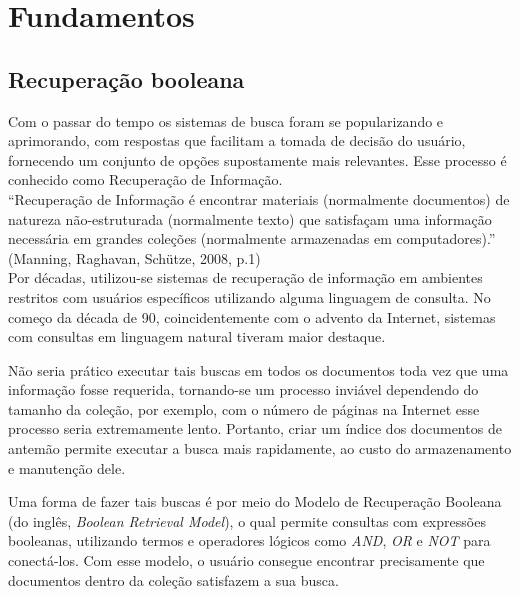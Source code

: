 \chapter{Fundamentos}
\label{cap:fundamentos}


\section{Recuperação booleana}
\label{sec:recuperacao_booleana}

Com o passar do tempo os sistemas de busca foram se popularizando e aprimorando, com respostas que facilitam a tomada de decisão do usuário, fornecendo um conjunto de opções supostamente mais relevantes. Esse processo é conhecido como Recuperação de Informação. \\

``Recuperação de Informação é encontrar materiais (normalmente documentos) de natureza não-estruturada (normalmente texto) que satisfaçam uma informação necessária em grandes coleções (normalmente armazenadas em computadores).'' (Manning, Raghavan, Schütze, 2008, p.1) \\

Por décadas, utilizou-se sistemas de recuperação de informação em ambientes restritos com usuários específicos utilizando alguma linguagem de consulta. No começo da década de 90, coincidentemente com o advento da Internet, sistemas com consultas em linguagem natural tiveram maior destaque.

Não seria prático executar tais buscas em todos os documentos toda vez que uma informação fosse requerida, tornando-se um processo inviável dependendo do tamanho da coleção, por exemplo, com o número de páginas na Internet esse processo seria extremamente lento. Portanto, criar um índice dos documentos de antemão permite executar a busca mais rapidamente, ao custo do armazenamento e manutenção dele.

Uma forma de fazer tais buscas é por meio do Modelo de Recuperação Booleana (do inglês, \emph{Boolean Retrieval Model}), o qual permite consultas com expressões booleanas, utilizando termos e operadores lógicos como \emph{AND}, \emph{OR} e \emph{NOT} para conectá-los. Com esse modelo, o usuário consegue encontrar precisamente que documentos dentro da coleção satisfazem a sua busca.


